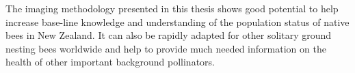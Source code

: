 The imaging methodology presented in this thesis shows good potential to help increase base-line knowledge and understanding of the population status of native bees in New Zealand. It can also be rapidly adapted for other solitary ground nesting bees worldwide and help to provide much needed information on the health of other important background pollinators. 

\vfill

\endgroup

\vfill


